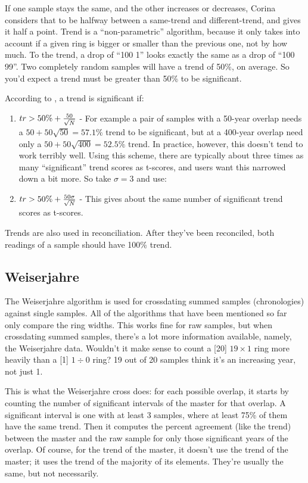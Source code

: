 If one sample stays the same, and the other increases or decreases, Corina considers that to be halfway between a same-trend and different-trend, and gives it half a point. Trend is a ``non-parametric'' algorithm, because it only takes into account if a given ring is bigger or smaller than the previous one, not by how much. To the trend, a drop of ``100 1'' looks exactly the same as a drop of ``100 99''. Two completely random samples will have a trend of 50\%, on average. So you'd expect a trend must be greater than 50\% to be significant.

According to \citet{Huber70}, a trend is significant if:

\begin{enumerate}
  \item \textbf{$tr > 50\% + {50 \over \sqrt{N}}$} - For example a pair of samples with a 50-year overlap needs a $50+50\sqrt{50} = 57.1\%$ trend to be significant, but at a 400-year overlap need only a $50 + 50\sqrt{400} = 52.5\%$ trend. In practice, however, this doesn't tend to work terribly well. Using this scheme, there are typically about three times as many ``significant'' trend scores as t-scores, and users want this narrowed down a bit more. So take $\sigma=3$ and use:
  \item $tr > 50\% + {50\sigma \over \sqrt{N}}$ - This gives about the same number of significant trend scores as t-scores. 

\end{enumerate}

Trends are also used in reconciliation. After they've been reconciled, both readings of a sample should have 100\% trend. 

\subsection{Weiserjahre}
The Weiserjahre algorithm is used for crossdating summed samples (chronologies) against single samples. All of the algorithms that have been mentioned so far only compare the ring widths. This works fine for raw samples, but when crossdating summed samples, there's a lot more information available, namely, the Weiserjahre data. Wouldn't it make sense to count a [20] $19\times1$ ring more heavily than a [1] $1\div0$ ring? 19 out of 20 samples think it's an increasing year, not just 1. 

This is what the Weiserjahre cross does: for each possible overlap, it starts by counting the number of significant intervals of the master for that overlap. A significant interval is one with at least 3 samples, where at least 75\% of them have the same trend. Then it computes the percent agreement (like the trend) between the master and the raw sample for only those significant years of the overlap. Of course, for the trend of the master, it doesn't use the trend of the master; it uses the trend of the majority of its elements. They're usually the same, but not necessarily.

